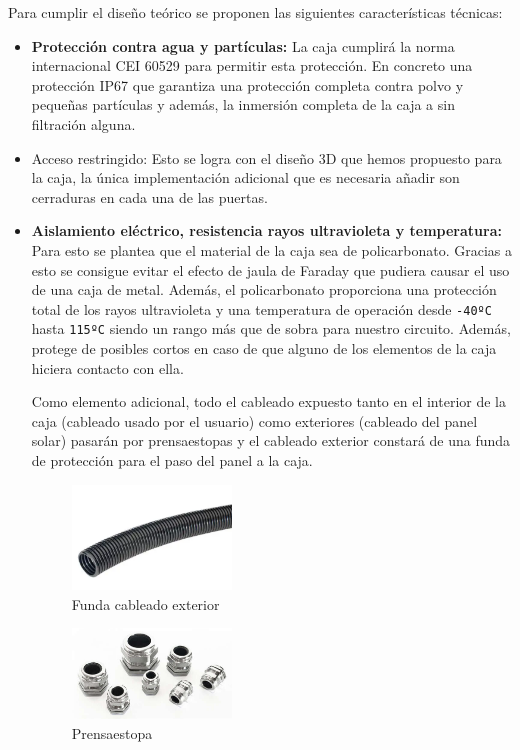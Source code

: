 Para cumplir el diseño teórico se proponen las siguientes características técnicas:
\begin{itemize}
    \item \textbf{Protección contra agua y partículas:} La caja cumplirá la norma internacional CEI 60529 para permitir esta protección. En concreto una protección IP67 que garantiza una protección completa contra polvo y pequeñas partículas y además, la inmersión completa de la caja a sin filtración alguna. \cite{iecInternationalStandardIEC}

    \item Acceso restringido: Esto se logra con el diseño 3D que hemos propuesto para la caja, la única implementación adicional que es necesaria añadir son cerraduras en cada una de las puertas.

    \item \textbf{Aislamiento eléctrico, resistencia rayos ultravioleta y temperatura:} Para esto se plantea que el material de la caja sea de policarbonato. Gracias a esto se consigue evitar el efecto de jaula de Faraday que pudiera causar el uso de una caja de metal. Además, el policarbonato proporciona una protección total de los rayos ultravioleta y una temperatura de operación desde \texttt{-40ºC} hasta \texttt{115ºC} siendo un rango más que de sobra para nuestro circuito. \cite{horeshPolycarbonateProtectionUV2021} Además, protege de posibles cortos en caso de que alguno de los elementos de la caja hiciera contacto con ella.

    Como elemento adicional, todo el cableado expuesto tanto en el interior de la caja (cableado usado por el usuario) como exteriores (cableado del panel solar) pasarán por prensaestopas y el cableado exterior constará de una funda de protección para el paso del panel a la caja.
    \begin{figure}[H]
        \centering
        \includegraphics[width=0.4\textwidth]{images/4-DesarrolloTeorico/4-1-caja/CAJA_FUNDAS.png}
        \caption{Funda cableado exterior}
        \label{fig:DesarrolloTeorico/Caja/CAJA_FUNDA}
    \end{figure}

    \begin{figure}[H]
        \centering
        \includegraphics[width=0.4\textwidth]{images/4-DesarrolloTeorico/4-1-caja/CAJA_PRENSAESTOPAS.png}
        \caption{Prensaestopa}
        \label{fig:DesarrolloTeorico/Caja/CAJA_PRENSAESTOPA}
    \end{figure}



\end{itemize}
